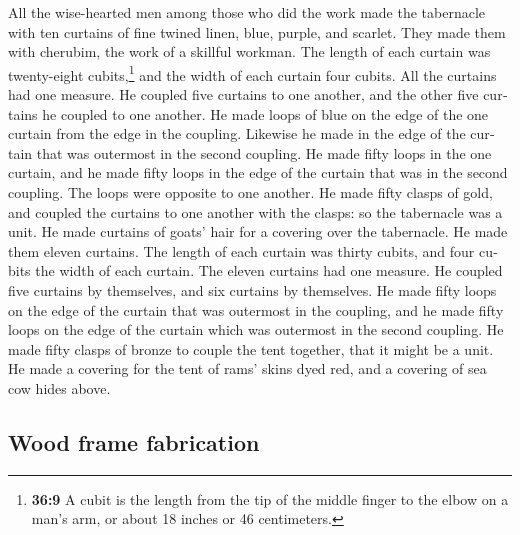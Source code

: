 \begin{paracol}{2}
\begin{otherlanguage}{english}
 All the wise-hearted men among those who did the work
made the tabernacle with ten curtains of fine twined linen, blue,
purple, and scarlet. They made them with cherubim, the work of a
skillful workman.  The length of each curtain was
twenty-eight cubits,\footnote{\textbf{36:9} A cubit is the length from
  the tip of the middle finger to the elbow on a man's arm, or about 18
  inches or 46 centimeters.} and the width of each curtain four cubits.
All the curtains had one measure.  He coupled five
curtains to one another, and the other five curtains he coupled to one
another.  He made loops of blue on the edge of the one
curtain from the edge in the coupling. Likewise he made in the edge of
the curtain that was outermost in the second coupling. 
He made fifty loops in the one curtain, and he made fifty loops in the
edge of the curtain that was in the second coupling. The loops were
opposite to one another.  He made fifty clasps of gold,
and coupled the curtains to one another with the clasps: so the
tabernacle was a unit.  He made curtains of goats' hair
for a covering over the tabernacle. He made them eleven curtains.
 The length of each curtain was thirty cubits, and four
cubits the width of each curtain. The eleven curtains had one measure.
 He coupled five curtains by themselves, and six curtains
by themselves.  He made fifty loops on the edge of the
curtain that was outermost in the coupling, and he made fifty loops on
the edge of the curtain which was outermost in the second coupling.
 He made fifty clasps of bronze to couple the tent
together, that it might be a unit.  He made a covering
for the tent of rams' skins dyed red, and a covering of sea cow hides
above.

\hypertarget{wood-frame-fabrication}{%
\subsection{Wood frame fabrication}\label{wood-frame-fabrication}}


\end{otherlanguage}
\end{paracol}
